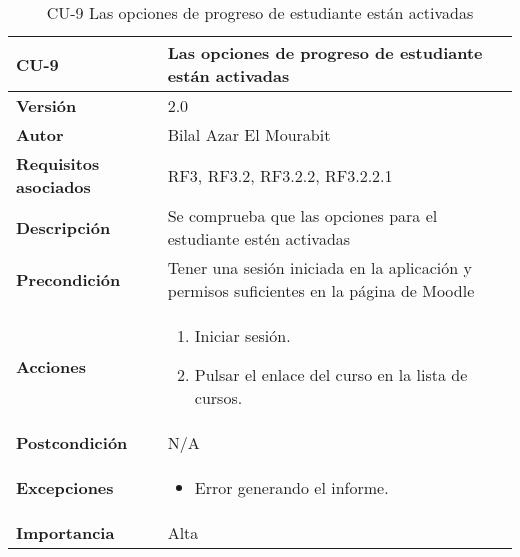 \begin{table}[H]
	\centering
	\begin{tabularx}{\linewidth}{ p{} p{} }
		\toprule
		\textbf{CU-9}    & \textbf{Las opciones de progreso de estudiante están activadas}\\
		\toprule
		\textbf{Versión}              & 2.0    \\
		\textbf{Autor}                & Bilal Azar El Mourabit \\
		\textbf{Requisitos asociados} & RF3, RF3.2, RF3.2.2, RF3.2.2.1 \\
		\textbf{Descripción}          & Se comprueba que las opciones para el estudiante estén activadas\\
    		\textbf{Precondición}         & Tener una sesión iniciada en la aplicación y permisos suficientes en la página de Moodle\\
		\textbf{Acciones}             & 
		\begin{enumerate}
			\def\labelenumi{\arabic{enumi}.}
			\tightlist
			\item Iniciar sesión.
            \item Pulsar el enlace del curso en la lista de cursos. 
		\end{enumerate}\\
		\textbf{Postcondición}        & N/A \\
		\textbf{Excepciones}          & \begin{itemize}
		    \item Error generando el informe.
		\end{itemize} \\
		\textbf{Importancia}          & Alta \\
		\bottomrule
	\end{tabularx}
	\caption{CU-9 Las opciones de progreso de estudiante están activadas}
\end{table}

